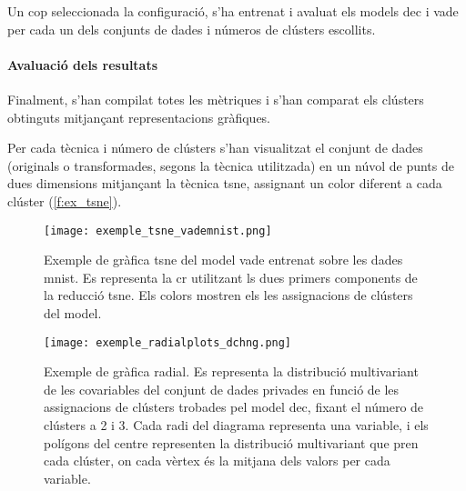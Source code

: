 \documentclass[CAT,BIB]{TFUOC}%
\begin{document}
        Un cop seleccionada la configuració,
        s'ha entrenat i avaluat els models \gls{dec} i \gls{vade}
        per cada un dels conjunts de dades
        i números de clústers escollits.

    \paragraph{Avaluació dels resultats}
        Finalment,
        s'han compilat totes les mètriques
        i s'han comparat els clústers obtinguts
        mitjançant representacions gràfiques.

        Per cada tècnica i número de clústers
        s'han visualitzat el conjunt de dades
        (originals o transformades, segons la tècnica utilitzada)
        en un núvol de punts de dues dimensions
        mitjançant la tècnica \gls{tsne},
        assignant un color diferent a cada clúster (\cref{f:ex_tsne}).

        \begin{figure}
        \begin{minipage}[c]{0.48\textwidth}
            \centering
            \texttt{[image: exemple\_tsne\_vademnist.png]}
            \caption[Exemple gràfica t-SNE]{
                Exemple de gràfica \gls{tsne}
                del model \gls{vade} entrenat sobre les dades \gls{mnist}.
                Es representa la \gls{cr} utilitzant ls dues primers components
                de la reducció \gls{tsne}.
                Els colors mostren els les assignacions de clústers del model.
            }
            \label{f:ex_tsne}
        \end{minipage} \hfill
        \begin{minipage}[c]{0.48\textwidth}
            \centering
            \texttt{[image: exemple\_radialplots\_dchng.png]}
            \caption[Exemple gràfica radial]{
                Exemple de gràfica radial.
                Es representa la distribució multivariant de les covariables
                del conjunt de dades \gls{privades}
                en funció de les assignacions de clústers
                trobades pel model \gls{dec},
                fixant el número de clústers a 2 i 3.
                Cada radi del diagrama representa una variable,
                i els polígons del centre representen la distribució multivariant que pren cada clúster,
                on cada vèrtex és la mitjana dels valors per cada variable.
            }
            \label{f:ex_radial}
        \end{minipage}
        \end{figure}
\end{document}
